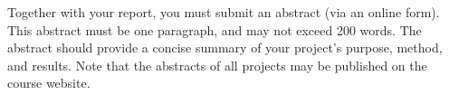 Together with your report, you must submit an abstract (via an online form). This abstract must be one paragraph, and may not exceed 200 words. The abstract should provide a concise summary of your project’s purpose, method, and results. Note that the abstracts of all projects may be published on the course website.